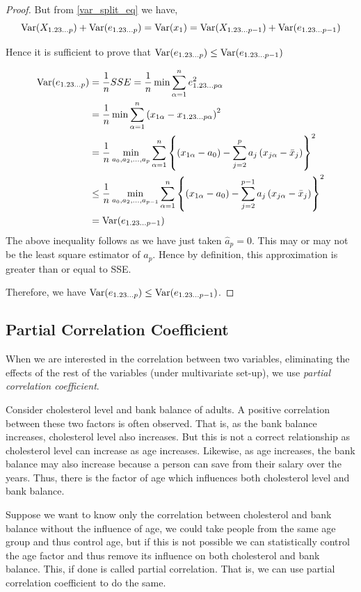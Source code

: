 \documentclass[10pt]{article}
\begin{document}
\begin{enumerate}[1., start = 4]
\begin{proof}
	 But from \eqref{var_split_eq} we have,
	 \[
		 \operatorname{Var}(X_{1.23\dots p}) + \operatorname{Var}(e_{1.23\dots p}) = \operatorname{Var}(x_{1}) = \operatorname{Var}(X_{1.23\dots p-1}) + \operatorname{Var}(e_{1.23\dots p-1})
	 \]

	 Hence it is sufficient to prove that \( \operatorname{Var}(e_{1.23\dots p}) \leq \operatorname{Var}(e_{1.23\dots p-1}) \)

	 \begin{align*}
		 \operatorname{Var}(e_{1.23\dots p}) &= \frac{1}{n} SSE = \frac{1}{n} \min \sum_{\alpha=1}^{n} e_{1.23\dots p \alpha}^{2} \\
				   &= \frac{1}{n} \min \sum_{\alpha=1}^{n} \left( x_{1\alpha} - x_{1.23\dots p \alpha} \right) ^{2} \\
				   &= \frac{1}{n} \min_{a_{0}, a_{2}, \dots, a_{p}} \sum_{\alpha=1}^{n} \left\{ (x_{1\alpha} - a_{0}) 
				   - \sum_{j=2}^{p} a_{j} \left( x_{j\alpha} - \bar{x}_{j} \right) \right\} ^{2} \\
				   & \leq \frac{1}{n} \min_{a_{0}, a_{2}, \dots, a_{p-1}} \sum_{\alpha=1}^{n} \left\{ (x_{1\alpha} - a_{0}) 
				   - \sum_{j=2}^{p-1} a_{j} \left( x_{j\alpha} - \bar{x}_{j} \right) \right\} ^{2} \\
				   &= \operatorname{Var}(e_{1.23\dots p-1}) 
	 \end{align*}
	 The above inequality follows as we have just taken \( \hat{a}_{p} = 0 \). This may or may not be the least square estimator of \( a_{p} \). Hence by definition, this approximation is greater than or equal to SSE. 

	 Therefore, we have \( \operatorname{Var}(e_{1.23\dots p}) \leq \operatorname{Var}(e_{1.23\dots p-1}) \).
 \end{proof}
 
\end{enumerate}

\subsection{Partial Correlation Coefficient}
When we are interested in the correlation between two variables, eliminating the effects of the rest of the variables (under multivariate set-up), we use \textit{partial correlation coefficient}.

\begin{example}
Consider cholesterol level and bank balance of adults. 
A positive correlation between these two factors is often observed. 
That is, as the bank balance increases, cholesterol level also increases. 
But this is not a correct relationship as cholesterol level can increase as age increases. 
Likewise, as age increases, the bank balance may also increase because a person can save from their salary over the years.
Thus, there is the factor of age which influences both cholesterol level and bank balance. 

Suppose we want to know only the correlation between cholesterol and bank balance without the influence of age, we could take people from the same age group and thus control age, but if this is not possible we can statistically control the age factor and thus remove its influence on both cholesterol and bank balance. 
This, if done is called partial correlation. 
That is, we can use partial correlation coefficient to do the same.
\end{example}
\end{document}
